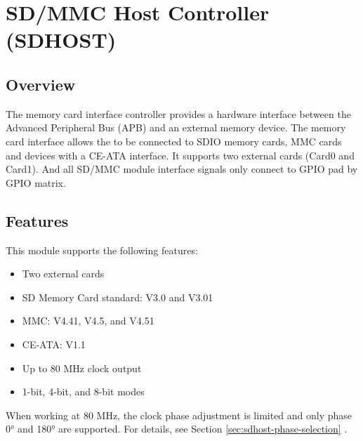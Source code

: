 \documentclass[main\_\_EN.tex]{subfiles}
\begin{document}

\ifglobal
\else
    {\let\clearpage\relax \listoftodos}
    \tableofcontents
\fi




\hypertarget{sdhost}{}
\chapter{SD/MMC Host Controller (SDHOST)}
\label{mod:sdhost}


\section{Overview}

The \chipname{} memory card interface controller provides a hardware interface between the Advanced Peripheral Bus (APB) and an external memory device. The memory card interface allows the \chipname{} to be connected to SDIO memory cards, MMC cards and devices with a CE-ATA interface. It supports two external cards (Card0 and Card1).
And all SD/MMC module interface signals only connect to GPIO pad by GPIO matrix.

\section{Features}
This module supports the following features:
\begin{itemize}
    \item Two external cards
    \item SD Memory Card standard: V3.0 and V3.01
    \item MMC: V4.41, V4.5, and V4.51
    \item CE-ATA: V1.1
    \item Up to 80 MHz clock output
    \item 1-bit, 4-bit, and 8-bit modes
\end{itemize}

\begin{tiplisting}
When working at 80 MHz, the clock phase adjustment is limited and only phase 0° and 180° are supported. For details, see Section \ref{sec:sdhost-phase-selection} \textit{}.
\end{tiplisting}
\end{document}
